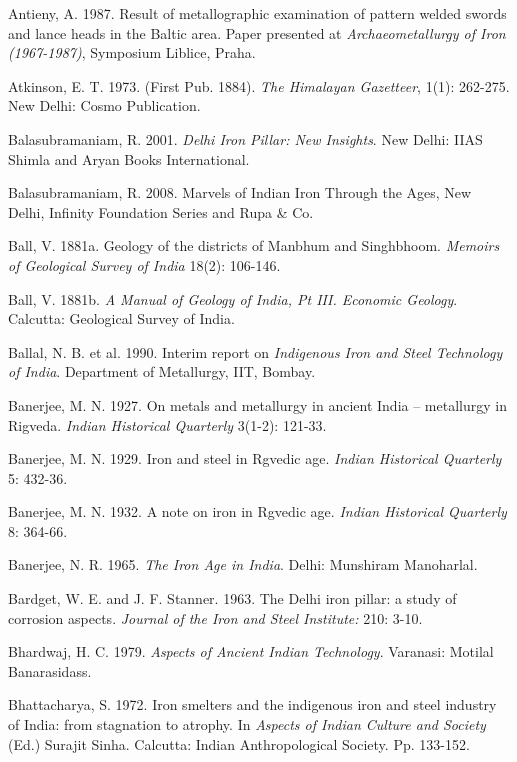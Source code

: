 \begin{thebibliography}{99}
 Antieny, A. 1987. Result of metallographic examination of pattern welded swords and lance heads in the Baltic area. Paper presented at \textit{Archaeometallurgy of Iron (1967-1987)}, Symposium Liblice, Praha.

 Atkinson, E. T. 1973. (First Pub. 1884). \textit{The Himalayan Gazetteer}, 1(1): 262-275. New Delhi: Cosmo Publication. 

 Balasubramaniam, R. 2001. \textit{Delhi Iron Pillar: New Insights}. New Delhi: IIAS Shimla and Aryan Books International.

 Balasubramaniam, R. 2008. Marvels of Indian Iron Through the Ages, New Delhi, Infinity Foundation Series and Rupa \& Co.

 Ball, V. 1881a. Geology of the districts of Manbhum and Singhbhoom. \textit{Memoirs of Geological Survey of India} 18(2): 106-146. 

 Ball, V. 1881b. \textit{A Manual of Geology of India, Pt III. Economic Geology}. Calcutta: Geological Survey of India. 

 Ballal, N. B. et al. 1990. Interim report on \textit{Indigenous Iron and Steel Technology of India}. Department of Metallurgy, IIT, Bombay.

 Banerjee, M. N. 1927. On metals and metallurgy in ancient India – metallurgy in Rigveda. \textit{Indian Historical Quarterly }3(1-2): 121-33.

 Banerjee, M. N. 1929. Iron and steel in Rgvedic age. \textit{Indian Historical Quarterly} 5: 432-36.

 Banerjee, M. N. 1932. A note on iron in Rgvedic age. \textit{Indian Historical Quarterly} 8: 364-66. 

 Banerjee, N. R. 1965. \textit{The Iron Age in India}. Delhi: Munshiram Manoharlal.

 Bardget, W. E. and J. F. Stanner. 1963. The Delhi iron pillar: a study of corrosion aspects. \textit{Journal of the Iron and Steel Institute:} 210: 3-10.

 Bhardwaj, H. C. 1979. \textit{Aspects of Ancient Indian Technology}. Varanasi: Motilal Banarasidass.

 Bhattacharya, S. 1972. Iron smelters and the indigenous iron and steel industry of India:  from stagnation to atrophy. In \textit{Aspects of Indian Culture and Society} (Ed.) Surajit Sinha. Calcutta: Indian Anthropological Society. Pp. 133-152.


\end{thebibliography}

